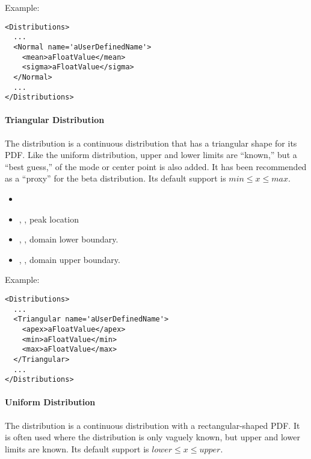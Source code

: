 Example:
\begin{lstlisting}[style=XML]
<Distributions>
  ...
  <Normal name='aUserDefinedName'>
    <mean>aFloatValue</mean>
    <sigma>aFloatValue</sigma>
  </Normal>
  ...
</Distributions>
\end{lstlisting}

\paragraph{Triangular Distribution}
\label{Triangular}
The  distribution is a continuous distribution that has a
triangular shape for its PDF.
%
%
Like the uniform distribution, upper and lower limits are ``known,'' but a
``best guess,'' of the mode or center point is also added.
%
It has been recommended as a ``proxy'' for the beta distribution.
%
Its default support is $min \le x \le max$.

%
\attrIntro
\vspace{-5mm}
\begin{itemize}
  \itemsep0em
  \item \nameDescription
\end{itemize}
\vspace{-5mm}
\subnodesIntro
\begin{itemize}
  \item {}, , peak location
  \item {}, , domain lower
  boundary.
  \item {}, , domain upper
  boundary.
\end{itemize}

Example:
\begin{lstlisting}[style=XML]
<Distributions>
  ...
  <Triangular name='aUserDefinedName'>
    <apex>aFloatValue</apex>
    <min>aFloatValue</min>
    <max>aFloatValue</max>
  </Triangular>
  ...
</Distributions>
\end{lstlisting}

\paragraph{Uniform Distribution}
\label{Uniform}
The  distribution is a continuous distribution with a
rectangular-shaped PDF.
%
It is often used where the distribution is only vaguely known, but upper and
lower limits are known.
%
Its default support is $lower \le x \le upper$.

